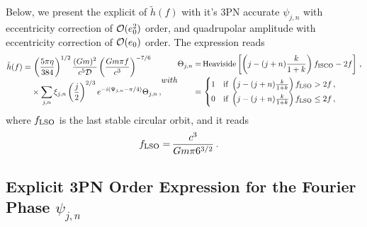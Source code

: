 \documentclass[aps,prd,twocolumn,superscriptaddress,groupedaddress,nofootinbib,showpacs,eqsecnum,useAms]{revtex4-2}
\begin{document}
Below, we present the explicit of $\tilde{h}(f)$ with it's 3PN accurate $\psi_{j,n}$ with eccentricity correction of ${\cal O}(e_0^2)$ order, and quadrupolar amplitude with eccentricity correction of ${\cal O}(e_0)$ order. The expression reads
\begin{subequations}
\begin{align}
\tilde{h}(f) = & \, \left( \frac{5\pi \eta}{384} \right)^{1/2} \frac{(G m)^2}{c^5 {\cal D}} \left(\frac{Gm\pi f}{c^3}\right)^{-7/6} \notag \\
&\times \sum_{j,n} \xi_{j,n} \left(\frac{j}{2}\right)^{2/3} e^{-i(\Psi_{j,n}-\pi/4)} \Theta_{j,n}\,,
\end{align}
with 
\begin{align}
\Theta_{j,n} = & \, \text{Heaviside}\left[ \left(j-(j+n)\frac{k}{1+k} \right)f_{\text{ISCO}}-2f \right]\,, \notag \\
=&\, 
    \begin{cases}
        1 & \text{if } \left(j-(j+n)\frac{k}{1+k} \right)f_{\text{LSO}} > 2f\,,\\
        0 & \text{if } \left(j-(j+n)\frac{k}{1+k} \right)f_{\text{LSO}} \leq 2f\,,
    \end{cases}
\end{align}
\end{subequations}
where $f_{\rm LSO}$ is the last stable circular orbit, and it reads
\begin{align}
    f_{\rm LSO} = &\, \frac{c^3}{G m \pi 6^{3/2}}\,. \label{eq:flso}
\end{align}

\subsection{Explicit 3PN Order Expression for the Fourier Phase $\psi_{j,n}$} \label{sec: TaylorF2Ecck psi}
\end{document}
